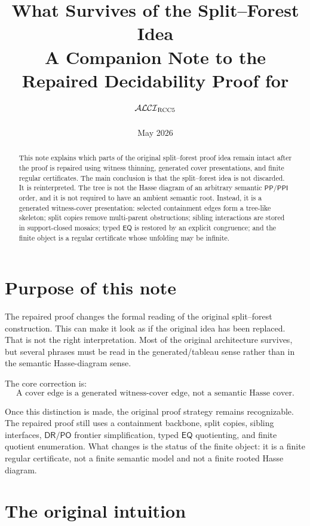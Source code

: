 \documentclass[11pt]{article}
\title{What Survives of the Split--Forest Idea\\
\large A Companion Note to the Repaired Decidability Proof for $\mathcal{ALCI}_{\mathrm{RCC5}}$}
\author{}
\date{May 2026}
\newcommand{\PP}{\mathsf{PP}}
\newcommand{\PPI}{\mathsf{PPI}}
\newcommand{\PO}{\mathsf{PO}}
\newcommand{\DR}{\mathsf{DR}}
\newcommand{\EQ}{\mathsf{EQ}}
\theoremstyle{definition}
\theoremstyle{plain}
\begin{document}
\maketitle

\begin{abstract}
This note explains which parts of the original split--forest proof idea remain intact after the proof is repaired using witness thinning, generated cover presentations, and finite regular certificates.  The main conclusion is that the split--forest idea is not discarded.  It is reinterpreted.  The tree is not the Hasse diagram of an arbitrary semantic $\PP/\PPI$ order, and it is not required to have an ambient semantic root.  Instead, it is a generated witness-cover presentation: selected containment edges form a tree-like skeleton; split copies remove multi-parent obstructions; sibling interactions are stored in support-closed mosaics; typed $\EQ$ is restored by an explicit congruence; and the finite object is a regular certificate whose unfolding may be infinite.
\end{abstract}

\tableofcontents

\section{Purpose of this note}

The repaired proof changes the formal reading of the original split--forest construction.  This can make it look as if the original idea has been replaced.  That is not the right interpretation.  Most of the original architecture survives, but several phrases must be read in the generated/tableau sense rather than in the semantic Hasse-diagram sense.

The core correction is:
\[
\boxed{\text{A cover edge is a generated witness-cover edge, not a semantic Hasse cover.}}
\]

Once this distinction is made, the original proof strategy remains recognizable.  The repaired proof still uses a containment backbone, split copies, sibling interfaces, $\DR/\PO$ frontier simplification, typed $\EQ$ quotienting, and finite quotient enumeration.  What changes is the status of the finite object: it is a finite regular certificate, not a finite semantic model and not a finite rooted Hasse diagram.

\section{The original intuition}
\end{document}
